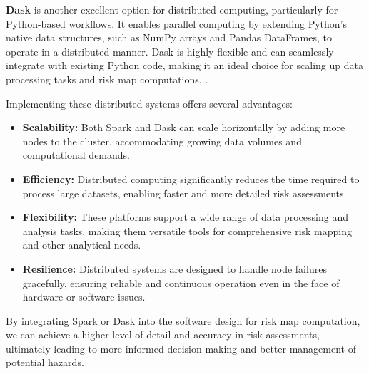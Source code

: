 \documentclass[12pt]{report}
\begin{document}
        \textbf{Dask} is another excellent option for distributed computing, particularly for Python-based workflows. It
        enables parallel computing by extending Python's native data structures, such as NumPy arrays and Pandas
        DataFrames, to operate in a distributed manner. Dask is highly flexible and can seamlessly integrate with
        existing Python code, making it an ideal choice for scaling up data processing tasks and risk map computations, 
        \cite{dask_development_team_dask_2016}.
        
        Implementing these distributed systems offers several advantages:
        \begin{itemize}
          \item \textbf{Scalability:} Both Spark and Dask can scale horizontally by adding more nodes to the cluster,
          accommodating growing data volumes and computational demands.
          \item \textbf{Efficiency:} Distributed computing significantly reduces the time required to process large
          datasets, enabling faster and more detailed risk assessments.
          \item \textbf{Flexibility:} These platforms support a wide range of data processing and analysis tasks, making
          them versatile tools for comprehensive risk mapping and other analytical needs.
          \item \textbf{Resilience:} Distributed systems are designed to handle node failures gracefully, ensuring
          reliable and continuous operation even in the face of hardware or software issues.
        \end{itemize}
        
        By integrating Spark or Dask into the software design for risk map computation, we can achieve a higher level of
        detail and accuracy in risk assessments, ultimately leading to more informed decision-making and better
        management of potential hazards.


\printbibliography
\end{document}
